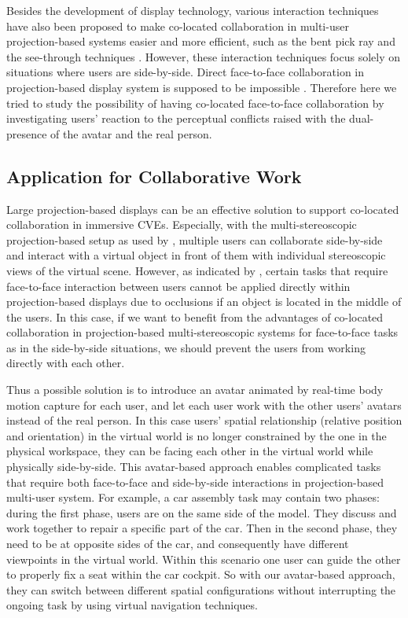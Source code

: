 Besides the development of display technology, various interaction techniques have also been proposed to make co-located collaboration in multi-user projection-based systems easier and more efficient, such as the bent pick ray \citep{Riege2006Bent} and the see-through techniques \citep{Argelaguet2010STT}. However, these interaction techniques focus solely on situations where users are side-by-side. Direct face-to-face collaboration in projection-based display system is supposed to be impossible \citep{Salzmann2009CIC}. Therefore here we tried to study the possibility of having co-located face-to-face collaboration by investigating users' reaction to the perceptual conflicts raised with the dual-presence of the avatar and the real person.

\subsection{Application for Collaborative Work}
Large projection-based displays can be an effective solution to support co-located collaboration in immersive CVEs. Especially, with the multi-stereoscopic projection-based setup as used by \citet{Salzmann2009VRPointing}, multiple users can collaborate side-by-side and interact with a virtual object in front of them with individual stereoscopic views of the virtual scene. However, as indicated by \citet{Salzmann2009CIC}, certain tasks that require face-to-face interaction between users cannot be applied directly within projection-based displays due to occlusions if an object is located in the middle of the users. In this case, if we want to benefit from the advantages of co-located collaboration in projection-based multi-stereoscopic systems for face-to-face tasks as in the side-by-side situations, we should prevent the users from working directly with each other.

Thus a possible solution is to introduce an avatar animated by real-time body motion capture for each user, and let each user work with the other users' avatars instead of the real person. In this case users' spatial relationship (relative position and orientation) in the virtual world is no longer constrained by the one in the physical workspace, they can be facing each other in the virtual world while physically side-by-side. This avatar-based approach enables complicated tasks that require both face-to-face and side-by-side interactions in projection-based multi-user system. For example, a car assembly task may contain two phases: during the first phase, users are on the same side of the model. They discuss and work together to repair a specific part of the car. Then in the second phase, they need to be at opposite sides of the car, and consequently have different viewpoints in the virtual world. Within this scenario one user can guide the other to properly fix a seat within the car cockpit. So with our avatar-based approach, they can switch between different spatial configurations without interrupting the ongoing task by using virtual navigation techniques.

